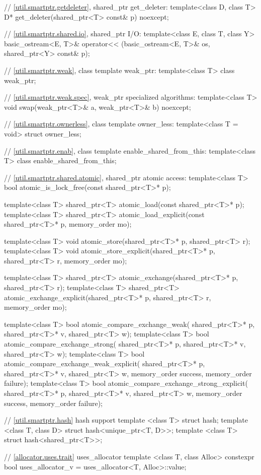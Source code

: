 \begin{codeblock}
{  // \ref{util.smartptr.getdeleter}, shared_ptr get_deleter:
  template<class D, class T> D* get_deleter(shared_ptr<T> const& p) noexcept;

  // \ref{util.smartptr.shared.io}, shared_ptr I/O:
  template<class E, class T, class Y>
    basic_ostream<E, T>& operator<< (basic_ostream<E, T>& os, shared_ptr<Y> const& p);

  // \ref{util.smartptr.weak}, class template weak_ptr:
  template<class T> class weak_ptr;

  // \ref{util.smartptr.weak.spec}, weak_ptr specialized algorithms:
  template<class T> void swap(weak_ptr<T>& a, weak_ptr<T>& b) noexcept;

  // \ref{util.smartptr.ownerless}, class template owner_less:
  template<class T = void> struct owner_less;

  // \ref{util.smartptr.enab}, class template enable_shared_from_this:
  template<class T> class enable_shared_from_this;

  // \ref{util.smartptr.shared.atomic}, shared_ptr atomic access:
  template<class T>
    bool atomic_is_lock_free(const shared_ptr<T>* p);

  template<class T>
    shared_ptr<T> atomic_load(const shared_ptr<T>* p);
  template<class T>
    shared_ptr<T> atomic_load_explicit(const shared_ptr<T>* p, memory_order mo);

  template<class T>
    void atomic_store(shared_ptr<T>* p, shared_ptr<T> r);
  template<class T>
    void atomic_store_explicit(shared_ptr<T>* p, shared_ptr<T> r, memory_order mo);

  template<class T>
    shared_ptr<T> atomic_exchange(shared_ptr<T>* p, shared_ptr<T> r);
  template<class T>
    shared_ptr<T> atomic_exchange_explicit(shared_ptr<T>* p, shared_ptr<T> r,
                                           memory_order mo);

  template<class T>
    bool atomic_compare_exchange_weak(
      shared_ptr<T>* p, shared_ptr<T>* v, shared_ptr<T> w);
  template<class T>
    bool atomic_compare_exchange_strong(
      shared_ptr<T>* p, shared_ptr<T>* v, shared_ptr<T> w);
  template<class T>
    bool atomic_compare_exchange_weak_explicit(
      shared_ptr<T>* p, shared_ptr<T>* v, shared_ptr<T> w,
      memory_order success, memory_order failure);
  template<class T>
    bool atomic_compare_exchange_strong_explicit(
      shared_ptr<T>* p, shared_ptr<T>* v, shared_ptr<T> w,
      memory_order success, memory_order failure);

  // \ref{util.smartptr.hash} hash support
  template <class T> struct hash;
  template <class T, class D> struct hash<unique_ptr<T, D>>;
  template <class T> struct hash<shared_ptr<T>>;

  // \ref{allocator.uses.trait} uses_allocator
  template <class T, class Alloc> constexpr bool uses_allocator_v
    = uses_allocator<T, Alloc>::value;
}
\end{codeblock}


